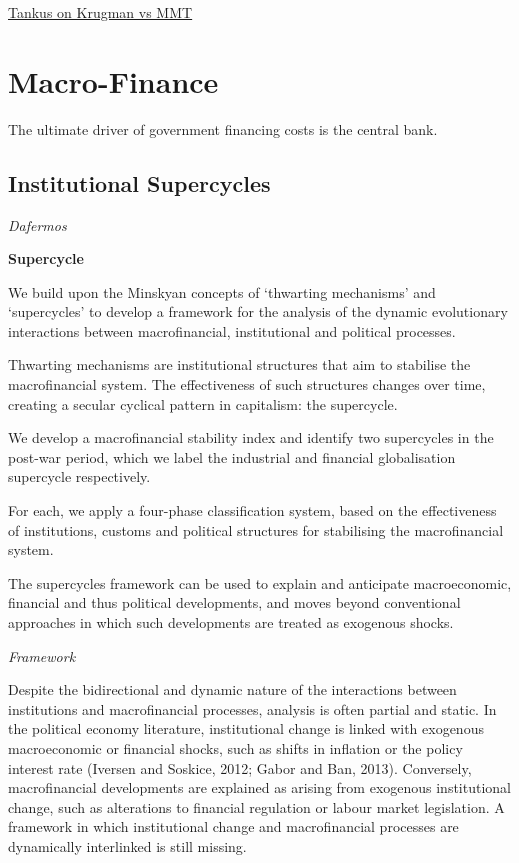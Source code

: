 \documentclass[
]{book}
\begin{document}
\href{https://www.crisesnotes.com/paul-krugman-functional-finance-flip-flop/}{Tankus on Krugman vs MMT}

\hypertarget{macro-finance}{%
\chapter{Macro-Finance}\label{macro-finance}}

The ultimate driver of government financing costs is the central bank.

\hypertarget{institutional-supercycles}{%
\section{Institutional Supercycles}\label{institutional-supercycles}}

\emph{Dafermos}

\textbf{Supercycle}

We build upon the Minskyan concepts of `thwarting mechanisms' and `supercycles' to
develop a framework for the analysis of
the dynamic evolutionary interactions between
macrofinancial, institutional and political processes.

Thwarting mechanisms are institutional structures that aim to
stabilise the macrofinancial system.
The effectiveness of such structures changes over time,
creating a secular cyclical pattern in capitalism: the supercycle.

We develop a macrofinancial stability index and identify two supercycles in the post-war period,
which we label the industrial and financial globalisation supercycle respectively.

For each, we apply a four-phase classification system, based on the
effectiveness of institutions, customs and political structures
for stabilising the macrofinancial system.

The supercycles framework can be used to explain and anticipate
macroeconomic, financial and thus political developments, and
moves beyond conventional approaches in which such developments are
treated as exogenous shocks.

\emph{Framework}

Despite the bidirectional and dynamic nature of the interactions between institutions and macrofinancial
processes, analysis is often partial and static. In the political economy literature, institutional change is
linked with exogenous macroeconomic or financial shocks, such as shifts in inflation or the policy
interest rate (Iversen and Soskice, 2012; Gabor and Ban, 2013). Conversely, macrofinancial
developments are explained as arising from exogenous institutional change, such as alterations to
financial regulation or labour market legislation. A framework in which institutional change and
macrofinancial processes are dynamically interlinked is still missing.
\end{document}
